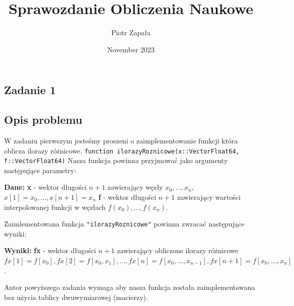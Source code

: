 \documentclass{article}
\title{Sprawozdanie Obliczenia Naukowe}
\author{Piotr Zapała}
\date{November 2023}
\begin{document}
\maketitle

\tableofcontents
\newpage
\begin{center}
    \section{Zadanie 1}
    \subsection{Opis problemu}
    \large W zadaniu pierwszym jesteśmy proszeni o zaimplementowanie funkcji która oblicza ilorazy różnicowe.
    \texttt{function ilorazyRoznicowe(x::Vector{Float64}, f::Vector{Float64})} \newline
     Nasza funkcja powinna przyjmować jako argumenty następujące parametry: \newline
     \begin{flushleft}
        \textbf{Dane:} \newline  
        \textbf{x} - wektor długości \(n + 1\) zawierający węzły \(x_{0}, \dots ,x_{n}\),   \(x[1] = x_{0},\dots,x[n+1]=x_{n}\) \newline
        \textbf{f} - wektor długości \(n + 1\) zawierający wartości interpolowanej funkcji w węzłach \(f(x_{0}),\dots,f(x_{n})\).
     \end{flushleft}
     Zaimlementowana funkcja \texttt{"ilorazyRoznicowe"} powinna zwracać następujące wyniki: \newline
     \begin{flushleft}
        \textbf{Wyniki:} \newline  
        \textbf{fx} - wektor długości \(n + 1\) zawierający obliczone ilorazy różnicowe \newline
        \(fx[1] = f[x_{0}], fx[2] = f[x_{0},x_{1}],\dots,fx[n] = f[x_{0},\dots,x_{n-1}], fx[n+1] = f[x_{0},\dots,x_{n}]\).  
     \end{flushleft}
      Autor powyższego zadania wymaga aby nasza funkcja została zaimplementowana bez użycia tablicy dwuwymiarowej (macierzy).


\end{center}
\end{document}
